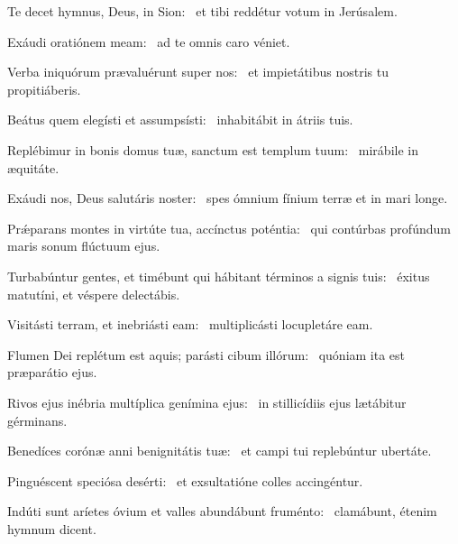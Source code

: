 \item Te decet hymnus, Deus, in Sion:~\psstar{} et tibi reddétur votum in Jerúsalem.

\item Exáudi oratiónem meam:~\psstar{} ad te omnis caro véniet.

\item Verba iniquórum prævaluérunt super nos:~\psstar{} et impietátibus nostris tu propitiáberis.

\item Beátus quem elegísti et assumpsísti:~\psstar{} inhabitábit in átriis tuis.

\item Replébimur in bonis domus tuæ, sanctum est templum tuum:~\psstar{} mirábile in æquitáte.

\item Exáudi nos, Deus salutáris noster:~\psstar{} spes ómnium fínium terræ et in mari longe.

\item Prǽparans montes in virtúte tua, accínctus poténtia:~\psstar{} qui contúrbas profúndum maris sonum flúctuum ejus.

\item Turbabúntur gentes, et timébunt qui hábitant términos a signis tuis:~\psstar{} éxitus matutíni, et véspere delectábis.

\item Visitásti terram, et inebriásti eam:~\psstar{} multiplicásti locupletáre eam.

\item Flumen Dei replétum est aquis; parásti cibum illórum:~\psstar{} quóniam ita est præparátio ejus.

\item Rivos ejus inébria multíplica genímina ejus:~\psstar{} in stillicídiis ejus lætábitur gérminans.

\item Benedíces corónæ anni benignitátis tuæ:~\psstar{} et campi tui replebúntur ubertáte.

\item Pinguéscent speciósa desérti:~\psstar{} et exsultatióne colles accingéntur.

\item Indúti sunt aríetes óvium et valles abundábunt fruménto:~\psstar{} clamábunt, étenim hymnum dicent.
